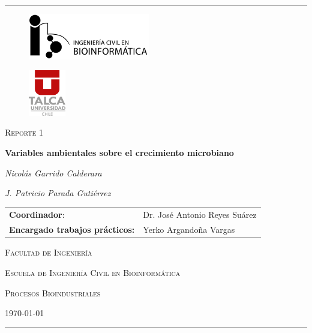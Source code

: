 \documentclass[a4paper,12pt]{article}
\begin{document}
  \begin{titlepage}
    \centering
    \rule[1ex]{\textwidth}{0.8pt}

    \vspace{1cm}
    \begin{minipage}[b]{.45\linewidth}
      \begin{figure}[H]
        \raggedright
        \includegraphics[height=2.0cm]{icb_logo}
      \end{figure}
    \end{minipage}
    \begin{minipage}[b]{.45\linewidth}
      \begin{figure}[H]
        \raggedleft
        \includegraphics[height=2.0cm]{utalca_logo}
      \end{figure}
    \end{minipage}

    \vspace{2cm}

    {\large \scshape Reporte 1 \par}
    \vspace{1cm}
    {\Large \bfseries Variables ambientales sobre el crecimiento microbiano \par}
    \vspace{2cm}
    {\itshape Nicolás Garrido Calderara \par}
    {\itshape J. Patricio Parada Gutiérrez \par}
    \vspace{2cm}

    \begin{tabular}{ll}
      \textbf{Coordinador}: & Dr. José Antonio Reyes Suárez \\
      \textbf{Encargado trabajos prácticos:} & Yerko Argandoña Vargas \\
    \end{tabular}

    \vfill
    {\scshape Facultad de Ingeniería \par}
    {\scshape Escuela de Ingeniería Civil en Bioinformática \par}
    {\scshape Procesos Bioindustriales \par}

    \vfill
    {\scshape \today \par}

    \vfill
    \rule{\textwidth}{0.8pt}

  \end{titlepage}
\end{document}
